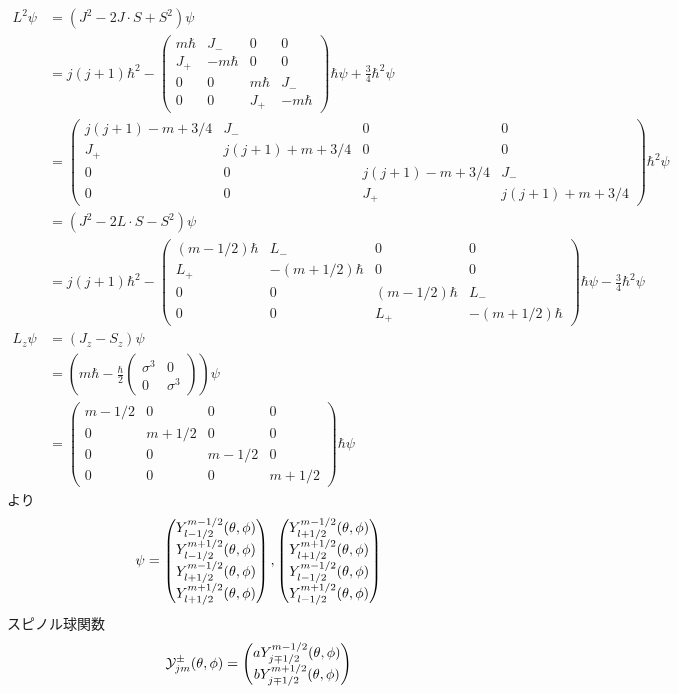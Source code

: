    \begin{align*}
        L^2\psi
            &= (J^2 - 2J \cdot S + S^2)\psi\\
            &= j(j + 1)\hbar^2 - \begin{pmatrix}
                m\hbar & J_- & 0 & 0\\
                J_+ & -m\hbar & 0 & 0\\
                0 & 0 & m\hbar & J_-\\
                0 & 0 & J_+ & -m\hbar
            \end{pmatrix}\hbar\psi + \frac{3}{4}\hbar^2\psi\\
            &= \begin{pmatrix}
                j(j + 1) - m + 3/4 & J_- & 0 & 0\\
                J_+ & j(j + 1) + m + 3/4 & 0 & 0\\
                0 & 0 & j(j + 1) - m + 3/4 & J_-\\
                0 & 0 & J_+ & j(j + 1) + m + 3/4
            \end{pmatrix}\hbar^2\psi\\
            &= (J^2 - 2L \cdot S - S^2)\psi\\
            &= j(j + 1)\hbar^2 - \begin{pmatrix}
                (m - 1/2)\hbar & L_- & 0 & 0\\
                L_+ & -(m + 1/2)\hbar & 0 & 0\\
                0 & 0 & (m - 1/2)\hbar & L_-\\
                0 & 0 & L_+ & -(m + 1/2)\hbar
            \end{pmatrix}\hbar\psi - \frac{3}{4}\hbar^2\psi\\
        L_z\psi
            &= (J_z - S_z)\psi\\
            &= \left(m\hbar - \frac{\hbar}{2}\begin{pmatrix} \sigma^3 & 0\\ 0 & \sigma^3 \end{pmatrix}\right)\psi\\
            &= \begin{pmatrix}
                m - 1/2 & 0 & 0 & 0\\
                0 & m + 1/2 & 0 & 0\\
                0 & 0 & m - 1/2 & 0\\
                0 & 0 & 0 & m + 1/2
            \end{pmatrix}\hbar\psi
    \end{align*}
    より
    \begin{align*}
        \psi = \begin{pmatrix} Y_{l-1/2}^{m-1/2}(\theta, \phi)\\ Y_{l-1/2}^{m+1/2}(\theta, \phi)\\ Y_{l+1/2}^{m-1/2}(\theta, \phi)\\ Y_{l+1/2}^{m+1/2}(\theta, \phi) \end{pmatrix}, \begin{pmatrix} Y_{l+1/2}^{m-1/2}(\theta, \phi)\\ Y_{l+1/2}^{m+1/2}(\theta, \phi)\\ Y_{l-1/2}^{m-1/2}(\theta, \phi)\\ Y_{l-1/2}^{m+1/2}(\theta, \phi) \end{pmatrix}
    \end{align*}
    スピノル球関数
        \[\mathcal{Y}_{jm}^\pm(\theta, \phi) = \begin{pmatrix} a Y_{j \mp 1/2}^{m - 1/2}(\theta, \phi)\\ b Y_{j \mp 1/2}^{m + 1/2}(\theta, \phi) \end{pmatrix}\]